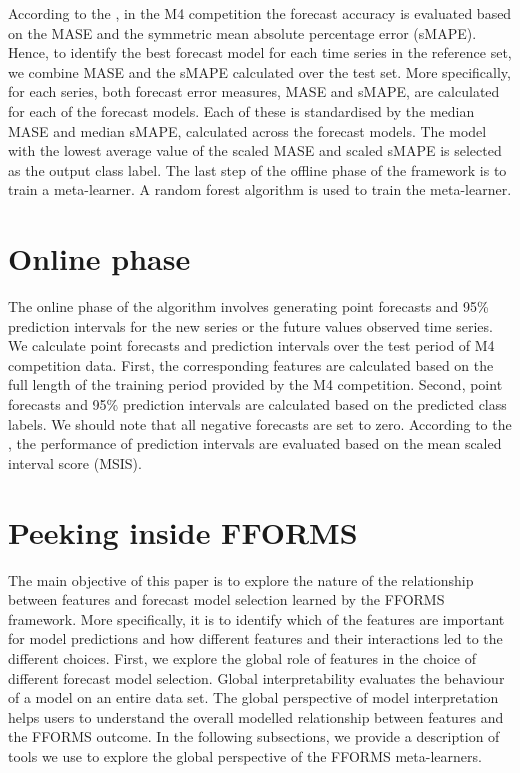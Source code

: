 \documentclass[11pt,a4paper,]{article}
\begin{document}
According to the \textcite{M4compguide}, in the M4 competition the forecast accuracy is evaluated based on the MASE and the symmetric mean absolute percentage error (sMAPE). Hence, to identify the best forecast model for each time series in the reference set, we combine MASE and the sMAPE calculated over the test set. More specifically, for each series, both forecast error measures, MASE and sMAPE, are calculated for each of the forecast models. Each of these is standardised by the median MASE and median sMAPE, calculated across the forecast models. The model with the lowest average value of the scaled MASE and scaled sMAPE is selected as the output class label. The last step of the offline phase of the framework is to train a meta-learner. A random forest algorithm is used to train the meta-learner.

\hypertarget{online}{%
\section{Online phase}\label{online}}

The online phase of the algorithm involves generating point forecasts and 95\% prediction intervals for the new series or the future values observed time series. We calculate point forecasts and prediction intervals over the test period of M4 competition data. First, the corresponding features are calculated based on the full length of the training period provided by the M4 competition. Second, point forecasts and 95\% prediction intervals are calculated based on the predicted class labels. We should note that all negative forecasts are set to zero. According to the \textcite{M4compguide}, the performance of prediction intervals are evaluated based on the mean scaled interval score (MSIS).

\hypertarget{peeking}{%
\section{Peeking inside FFORMS}\label{peeking}}

The main objective of this paper is to explore the nature of the relationship between features and forecast model selection learned by the FFORMS framework. More specifically, it is to identify which of the features are important for model predictions and how different features and their interactions led to the different choices. First, we explore the global role of features in the choice of different forecast model selection. Global interpretability evaluates the behaviour of a model on an entire data set. The global perspective of model interpretation helps users to understand the overall modelled relationship between features and the FFORMS outcome. In the following subsections, we provide a description of tools we use to explore the global perspective of the FFORMS meta-learners.
\end{document}
